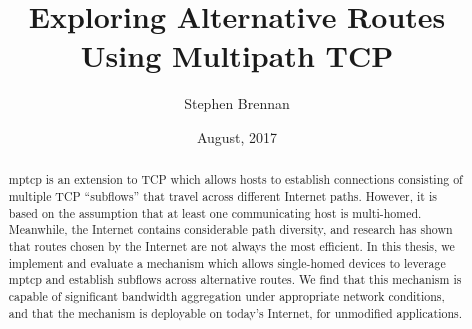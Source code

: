 \documentclass{cwru}
\title{Exploring Alternative Routes Using Multipath TCP}
\author{Stephen Brennan}
\date{August, 2017} %
\begin{document}

%

\maketitle
\makeapprovalsheet

\setcounter{tocdepth}{1}
\frontmatter
\tableofcontents

\cleardoublepage
{}
{}
\listoftables
{}
\listoffigures





\acresetall

\begin{abstract}
  \ac{mptcp} is an extension to TCP which allows hosts to establish connections
  consisting of multiple TCP ``subflows'' that travel across different Internet
  paths. However, it is based on the assumption that at least one communicating
  host is multi-homed. Meanwhile, the Internet contains considerable path
  diversity, and research has shown that routes chosen by the Internet are not
  always the most efficient. In this thesis, we implement and evaluate a
  mechanism which allows single-homed devices to leverage \ac{mptcp} and
  establish subflows across alternative routes. We find that this mechanism is
  capable of significant bandwidth aggregation under appropriate network
  conditions, and that the mechanism is deployable on today's Internet, for
  unmodified applications.
\end{abstract}
\end{document}
